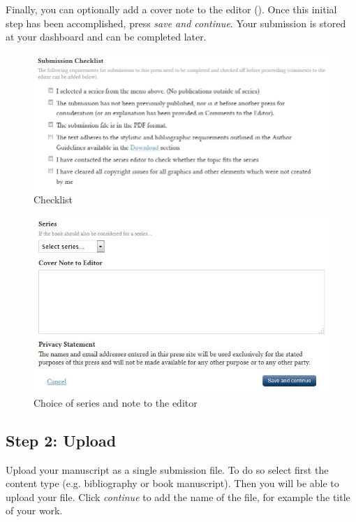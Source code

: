Finally, you can optionally add a cover note to the editor (). Once this initial step has been accomplished, press \textit{save and continue}. Your submission is stored at your dashboard and can be completed later.

\begin{figure}[h] \centering 
\includegraphics[width=1\textwidth]{./img/checklist.jpg} 
\caption{Checklist}
\label{fig:checklist}
\end{figure}

\begin{figure}[h]
\centering
\includegraphics[width=1\textwidth]{./img/submission-3.jpg}
\caption{Choice of series and note to the editor}
\label{fig:submission3}
\end{figure}

\newpage

\subsection*{Step 2: Upload}
Upload your manuscript as a single submission file. To do so select first the content type (e.g. bibliography or book manuscript). Then you will be able to upload your file. Click \textit{continue} to add the name of the file, for example the title of your work.

